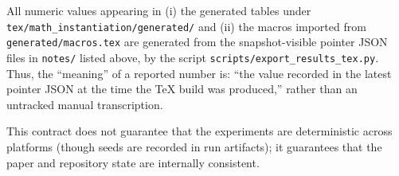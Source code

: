 \begin{remark}
All numeric values appearing in (i) the generated tables under \texttt{tex/math\_instantiation/generated/} and (ii) the macros imported from \texttt{generated/macros.tex} are generated from the snapshot-visible pointer JSON files in \texttt{notes/} listed above, by the script \texttt{scripts/export\_results\_tex.py}.
Thus, the ``meaning'' of a reported number is: ``the value recorded in the latest pointer JSON at the time the TeX build was produced,'' rather than an untracked manual transcription.
\end{remark}

This contract does not guarantee that the experiments are deterministic across platforms (though seeds are recorded in run artifacts); it guarantees that the paper and repository state are internally consistent.
